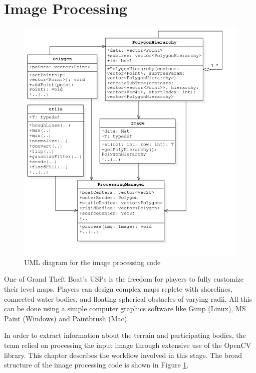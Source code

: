 \section{Image Processing}

\begin{figure}
\centering
  \includegraphics[scale=0.6]{img/ImageProcessing/UML_ImgProc_PNG.png}
\caption{UML diagram for the image processing code\label{fig:UMLImgProc}}
\end{figure}

One of Grand Theft Boat's USPs is the freedom for players to fully customize their level maps. Players can design complex maps replete with shorelines, connected water bodies, and floating spherical obstacles of varying radii. All this can be done using a simple computer graphics software like Gimp (Linux), MS Paint (Windows) and Paintbrush (Mac). 

In order to extract information about the terrain and participating bodies, the team relied on processing the input image through extensive use of the OpenCV library. This chapter describes the workflow involved in this stage. The broad structure of the image processing code is shown in Figure \ref{fig:UMLImgProc}.




